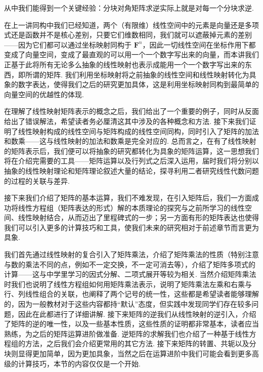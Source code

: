 从中我们能得到一个关键经验：分块对角矩阵求逆实际上就是对每一个分块求逆.

\begin{summary}

    在上一讲同构中我们已经知道，两个（有限维）线性空间中的元素是向量还是多项式还是函数并不是核心差别，只要它们维数相同，我们就可以遮蔽掉元素的差别——因为它们都可以通过坐标映射同构于 $\mathbf{F}^n$，因此一切线性空间在坐标作用下都变成了向量空间，变成了最直观的可以用一个一个数字写出来的向量，而本讲我们正基于此将所有无论多么抽象的线性映射也表示成能用一个一个数字写出来的东西，即所谓的矩阵. 我们利用坐标映射将之前抽象的线性空间和线性映射转化为具象的数字表达，使得我们之后的研究更加具体，这是利用坐标映射同构到最简单的向量空间的优越性的体现.

    在理解了线性映射矩阵表示的概念之后，我们给出了一个重要的例子，同时从反面给出了错误解法，希望读者务必厘清这其中涉及的各种概念和方法. 接下来我们证明了线性映射构成的线性空间与矩阵构成的线性空间同构，同时引入了矩阵的加法和数乘——这与线性映射的加法和数乘是完全对应的. 总而言之，在有了线性映射的矩阵表示后，我们便可以将抽象的研究都转化为具象的矩阵运算，这一思想我们将在介绍完需要的工具——矩阵运算以及行列式之后深入运用，届时我们将分别以抽象的线性映射理论和矩阵理论叙述大量的结论，探寻利用二者研究线性代数问题的过程的关联与差异.

    接下来我们介绍了矩阵的基本运算，我们不难发现，在引入矩阵后，我们一方面成功将线性方程组（矩阵表达的形式）解的本质理论的探究与之前所学习的线性空间、线性映射结合，从而迈出了里程碑式的一步；另一方面有形的矩阵表达也使得我们可以引入更多的计算技巧和工具，使我们未来的研究相对于前述章节而言更为具象.

    我们首先通过线性映射的复合引入了矩阵乘法，介绍了矩阵乘法的性质（特别注意与数的乘法不同的点，例如不一定交换，不一定可消去等），介绍了矩阵多项式的计算——这与中学里学习的因式分解、二项式展开等较为相关. 当然介绍矩阵乘法时我们也说明了线性方程组如何用矩阵乘法表示，说明了矩阵乘法左乘和右乘与行、列线性组合的关联，也阐释了两个记号的统一性，这些都是希望读者能够理解的，因为一般教材对于这些内容都持``默认''态度，但实践中发现同学们存在较多问题，因此在此都进行了详细讲解. 接下来矩阵的逆我们从线性映射的逆引入，介绍了矩阵的逆的唯一性，以及一些基本性质，这些性质的证明都非常基本，读者应当熟练，为之后的矩阵运算进阶做准备. 逆矩阵的求解我们也介绍了一种基于线性方程组的方法，之后我们会介绍更常用的其它方法. 接下来矩阵的转置、共轭以及分块则显得更加简单，因为更加具象，当然之后在运算进阶中我们可能会看到更多高级的计算技巧，本节的内容仅仅是一个开始.
\end{summary}


